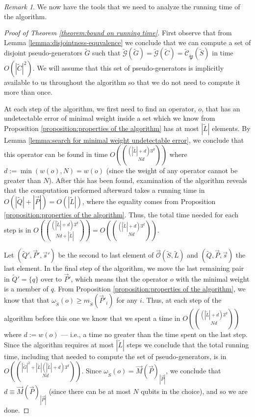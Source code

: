 \documentclass{amsbook}
\theoremstyle{plain}
\theoremstyle{definition}
\theoremstyle{remark}
\newtheorem{remark}{Remark}
\newcommand{\lst}{\vec}
\newcommand{\set}{\tilde}
\newcommand{\genfun}{\tilde{\mathcal{G}}}
\newcommand{\pauligroup}{{\set{\mathfrak{P}}}}
\newcommand{\centralizer}{\set{\mathcal{C}}}
\newcommand{\optimizer}{\lst{\mathcal{O}}}
\newcommand{\om}{\omega}
\newcommand{\paren}[1]{\left(#1\right)}
\begin{document}
\begin{remark}
We now have the tools that we need to analyze the running time of the algorithm.
\end{remark}

\begin{proof}[Proof of Theorem \ref{theorem:bound on running time}]
First observe that from Lemma \ref{lemma:disjointness-equvalence} we conclude that we can compute a set of disjoint pseudo-generators $\set G$ such that $\genfun(\set G)=\genfun(\set C)=\centralizer_\pauligroup(\set S)$ in time $O(|\set C|^2)$.  We will assume that this set of pseudo-generators is implicitly available to us throughout the algorithm so that we do not need to compute it more than once.

At each step of the algorithm, we first need to find an operator, $o$, that has an undetectable error of minimal weight inside a set which we know from Proposition \ref {proposition:properties of the algorithm} has at most $|\set L|$ elements.  By Lemma \ref{lemma:search for minimal weight undetectable error}, we conclude that this operator can be found in time $O\paren{(|\set L|+d)3^d\choose{N}{d}}$ where $d:=\min\paren{w(o),N}=w(o)$ (since the weight of any operator cannot be greater than $N$).  After this has been found, examination of the algorithm reveals that the computation performed afterward takes a running time in $O(|\set Q|+|\lst P|)=O(|\set L|)$, where the equality comes from Proposition \ref {proposition:properties of the algorithm}.  Thus, the total time needed for each step is in $O\paren{(|\set L|+d)3^d\choose{N}{d}+|\set L|}=O\paren{(|\set L|+d)3^d\choose{N}{d}}$.

Let $(\set Q',\lst P',\lst s')$ be the second to last element of $\optimizer(\set S,\set L)$ and $(\set Q,\lst P,\lst s)$ the last element.  In the final step of the algorithm, we move the last remaining pair in $\set Q'=\{q\}$ over to $\lst P'$, which means that the operator $o$ with the minimal weight is a member of $q$.  From Proposition \ref {proposition:properties of the algorithm}, we know that that $\om_{\set S}(o)\ge m_{\set S}(\lst P'_i)$ for any $i$.  Thus, at each step of the algorithm before this one we know that we spent a time in $O\paren{(|\set L|+d)3^d\choose{N}{d}}$ where $d:=w(o)$ --- i.e., a time no greater than the time spent on the last step.  Since the algorithm requires at most $|\set L|$ steps we conclude that the total running time, including that needed to compute the set of pseudo-generators, is in $O\paren{|\set G|^2+|\set L|(|\set L|+d)3^d\choose{N}{d}}$.  Since $\om_{\set S}(o)=\lst M(\lst P)_{|\lst P|}$, we conclude that $d\equiv\lst M(\lst P)_{|\lst P|}$ (since there can be at most $N$ qubits in the choice), and so we are done.
\end{proof}
\end{document}
